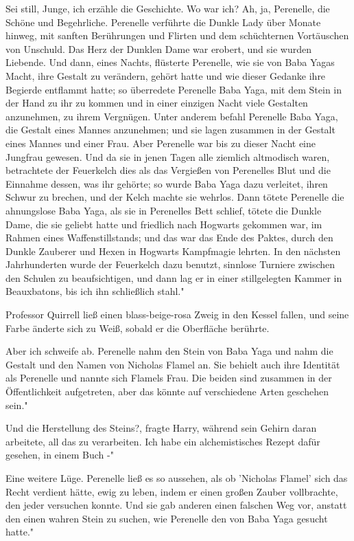 \glqq{}Sei still, Junge, ich erzähle die Geschichte. Wo war ich? Ah, ja,
Perenelle, die Schöne und Begehrliche. Perenelle verführte die Dunkle Lady über
Monate hinweg, mit sanften Berührungen und Flirten und dem schüchternen
Vortäuschen von Unschuld. Das Herz der Dunklen Dame war erobert, und sie wurden
Liebende. Und dann, eines Nachts, flüsterte Perenelle, wie sie von Baba Yagas
Macht, ihre Gestalt zu verändern, gehört hatte und wie dieser Gedanke ihre
Begierde entflammt hatte; so überredete Perenelle Baba Yaga, mit dem Stein in
der Hand zu ihr zu kommen und in einer einzigen Nacht viele Gestalten
anzunehmen, zu ihrem Vergnügen. Unter anderem befahl Perenelle Baba Yaga, die
Gestalt eines Mannes anzunehmen; und sie lagen zusammen in der Gestalt eines
Mannes und einer Frau. Aber Perenelle war bis zu dieser Nacht eine Jungfrau
gewesen. Und da sie in jenen Tagen alle ziemlich altmodisch waren, betrachtete
der Feuerkelch dies als das Vergießen von Perenelles Blut und die Einnahme
dessen, was ihr gehörte; so wurde Baba Yaga dazu verleitet, ihren Schwur zu
brechen, und der Kelch machte sie wehrlos. Dann tötete Perenelle die ahnungslose
Baba Yaga, als sie in Perenelles Bett schlief, tötete die Dunkle Dame, die sie
geliebt hatte und friedlich nach Hogwarts gekommen war, im Rahmen eines
Waffenstillstands; und das war das Ende des Paktes, durch den Dunkle Zauberer
und Hexen in Hogwarts Kampfmagie lehrten. In den nächsten Jahrhunderten wurde
der Feuerkelch dazu benutzt, sinnlose Turniere zwischen den Schulen zu
beaufsichtigen, und dann lag er in einer stillgelegten Kammer in Beauxbatons,
bis ich ihn schließlich stahl."

Professor Quirrell ließ einen blass-beige-rosa Zweig in den Kessel fallen, und
seine Farbe änderte sich zu Weiß, sobald er die Oberfläche berührte.

\glqq{}Aber ich schweife ab. Perenelle nahm den Stein von Baba Yaga und nahm die
Gestalt und den Namen von Nicholas Flamel an. Sie behielt auch ihre Identität
als Perenelle und nannte sich Flamels Frau. Die beiden sind zusammen in der
Öffentlichkeit aufgetreten, aber das könnte auf verschiedene Arten geschehen
sein."

\glqq{}Und die Herstellung des Steins?\grqq{}, fragte Harry, während sein Gehirn
daran arbeitete, all das zu verarbeiten. \glqq{}Ich habe ein alchemistisches
Rezept dafür gesehen, in einem Buch -"

\glqq{}Eine weitere Lüge. Perenelle ließ es so aussehen, als ob 'Nicholas Flamel'
sich das Recht verdient hätte, ewig zu leben, indem er einen großen Zauber
vollbrachte, den jeder versuchen konnte. Und sie gab anderen einen falschen Weg
vor, anstatt den einen wahren Stein zu suchen, wie Perenelle den von Baba Yaga
gesucht hatte."

